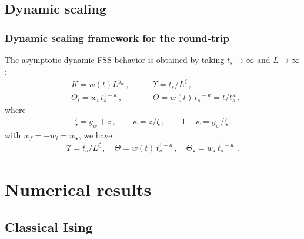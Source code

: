 \subsection{Dynamic scaling}

\begin{frame}
	\frametitle{Dynamic scaling framework for the round-trip}
	The asymptotic dynamic FSS behavior is obtained by taking 
	$t_s \to \infty$ and $L \to \infty\,$:
	\begin{eqnarray}
  		&K = w(t) L^{y_w}\,, \qquad &\Upsilon = t_s/L^{\zeta}\,,  
  		\label{KZscavar}\\
 		 &\Theta_i
 		 = w_i\, t_s^{1-\kappa} \,,\qquad &\Theta = w(t) \,
  		t_s^{1-\kappa} = t / t_s^{\kappa} \,,\nonumber
	\end{eqnarray}
	where
	\begin{eqnarray}
		\zeta = y_w + z\,,\qquad 
		\kappa = {z/\zeta} \,,\qquad
		1-\kappa = {y_w/\zeta}\,.\label{KZexps}
	\end{eqnarray}
	with $w_f = - w_i = w _\star$, we have:
	\begin{eqnarray}
  		\Upsilon = t_s/L^{\zeta}\,, \quad
  		\Theta = w(t) \, t_s^{1-\kappa}\,,\quad
  		\Theta_\star =  w_\star\, t_s^{1-\kappa} \,\,.
 		\label{scalvar2}
  	\end{eqnarray}
\end{frame}




\section{Numerical results}


\subsection{Classical Ising}


